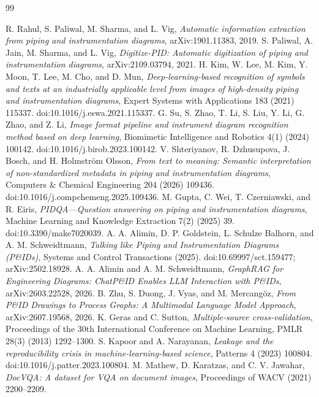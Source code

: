 \documentclass[11pt]{article}
\begin{document}
\begin{thebibliography}{99}
\raggedright
{} R. Rahul, S. Paliwal, M. Sharma, and L. Vig, \emph{Automatic information extraction from piping and instrumentation diagrams}, arXiv:1901.11383, 2019.
 S. Paliwal, A. Jain, M. Sharma, and L. Vig, \emph{Digitize-PID: Automatic digitization of piping and instrumentation diagrams}, arXiv:2109.03794, 2021.
 H. Kim, W. Lee, M. Kim, Y. Moon, T. Lee, M. Cho, and D. Mun, \emph{Deep-learning-based recognition of symbols and texts at an industrially applicable level from images of high-density piping and instrumentation diagrams}, Expert Systems with Applications 183 (2021) 115337. doi:10.1016/j.eswa.2021.115337.
 G. Su, S. Zhao, T. Li, S. Liu, Y. Li, G. Zhao, and Z. Li, \emph{Image format pipeline and instrument diagram recognition method based on deep learning}, Biomimetic Intelligence and Robotics 4(1) (2024) 100142. doi:10.1016/j.birob.2023.100142.
 V. Shteriyanov, R. Dzhusupova, J. Bosch, and H. Holmstr\"om Olsson, \emph{From text to meaning: Semantic interpretation of non-standardized metadata in piping and instrumentation diagrams}, Computers \& Chemical Engineering 204 (2026) 109436. doi:10.1016/j.compchemeng.2025.109436.
 M. Gupta, C. Wei, T. Czerniawski, and R. Eiris, \emph{PIDQA---Question answering on piping and instrumentation diagrams}, Machine Learning and Knowledge Extraction 7(2) (2025) 39. doi:10.3390/make7020039.
 A. A. Alimin, D. P. Goldstein, L. Schulze Balhorn, and A. M. Schweidtmann, \emph{Talking like Piping and Instrumentation Diagrams (P\&IDs)}, Systems and Control Transactions (2025). doi:10.69997/sct.159477; arXiv:2502.18928.
 A. A. Alimin and A. M. Schweidtmann, \emph{GraphRAG for Engineering Diagrams: ChatP\&ID Enables LLM Interaction with P\&IDs}, arXiv:2603.22528, 2026.
 B. Zhu, S. Duong, J. Vyas, and M. Mercang\"oz, \emph{From P\&ID Drawings to Process Graphs: A Multimodal Language Model Approach}, arXiv:2607.19568, 2026.
 K. Geras and C. Sutton, \emph{Multiple-source cross-validation}, Proceedings of the 30th International Conference on Machine Learning, PMLR 28(3) (2013) 1292--1300.
 S. Kapoor and A. Narayanan, \emph{Leakage and the reproducibility crisis in machine-learning-based science}, Patterns 4 (2023) 100804. doi:10.1016/j.patter.2023.100804.
 M. Mathew, D. Karatzas, and C. V. Jawahar, \emph{DocVQA: A dataset for VQA on document images}, Proceedings of WACV (2021) 2200--2209.

\end{thebibliography}
\end{document}
